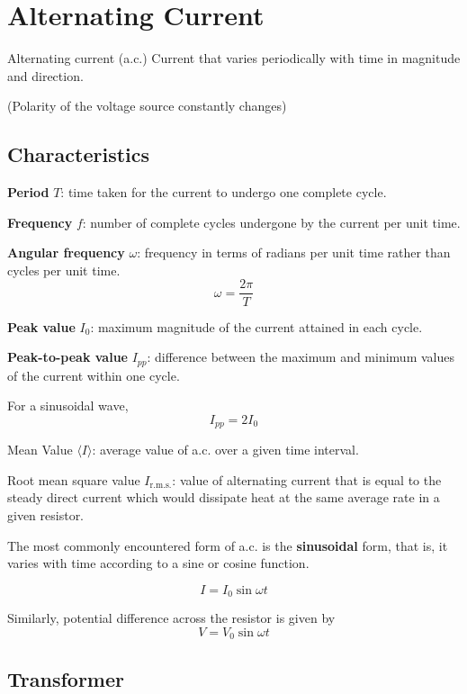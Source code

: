 \section{Alternating Current}
\begin{defn}{Alternating current (a.c.)}{}
Current that varies periodically with time in magnitude and direction. 

(Polarity of the voltage source constantly changes)
\end{defn}

\subsection{Characteristics}
\textbf{Period} $T$: time taken for the current to undergo one complete cycle.

\textbf{Frequency} $f$: number of complete cycles undergone by the current per unit time.

\textbf{Angular frequency} $\omega$: frequency in terms of radians per unit time rather than cycles per unit time.
\[ \omega = \frac{2\pi}{T} \]

\textbf{Peak value} $I_0$: maximum magnitude of the current attained in each cycle.

\textbf{Peak-to-peak value} $I_{pp}$: difference between the maximum and minimum values of the current within one cycle.

For a sinusoidal wave, 
\[ I_{pp} = 2I_0 \]

Mean Value $\langle I\rangle$: average value of a.c. over a given time interval.

Root mean square value $I_\text{r.m.s.}$: value of alternating current that is equal to the steady direct current which would dissipate heat at the same average rate in a given resistor.

The most commonly encountered form of a.c. is the \textbf{sinusoidal} form, that is, it varies with time according to a sine or cosine function.

\begin{equation}
I = I_0 \sin \omega t
\end{equation}

Similarly, potential difference across the resistor is given by 
\[ V = V_0 \sin \omega t \]



\subsection{Transformer}
